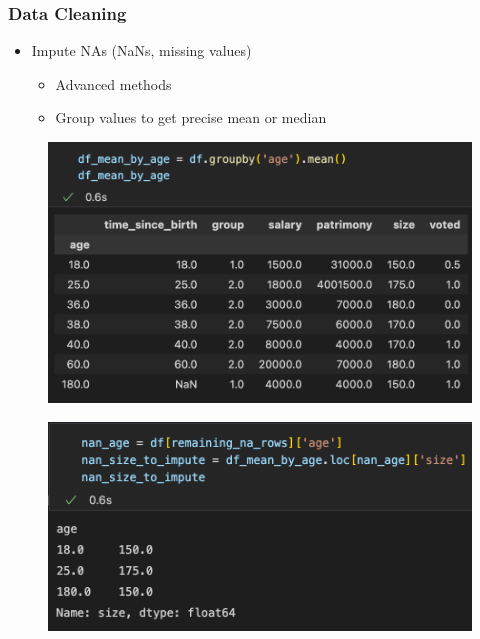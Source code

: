 \begin{frame}
\end{frame}


\begin{frame}\frametitle{Data Cleaning}
   \begin{itemize}
      \item Impute NAs (NaNs, missing values)
      \begin{itemize}
         \item Advanced methods
         \item Group values to get precise mean or median
      \end{itemize}
   \end{itemize}
   \vspace{.1cm}
   \begin{minipage}{0.58\linewidth}
      \begin{figure}[H]
         \includegraphics[scale=.35]{../images/illustrations/data_cleaning_na_imputation_group_by_1.png}
      \end{figure}
   \end{minipage}
   \vspace{.1cm}
   \begin{minipage}{0.54\linewidth}
      \begin{figure}[H]
         \includegraphics[scale=.35]{../images/illustrations/data_cleaning_na_imputation_group_by_2.png}
      \end{figure}
   \end{minipage}
   
\end{frame}

